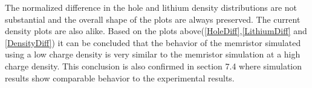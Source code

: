 \begin{doublespace}
 The normalized difference in the hole and lithium density distributions are not substantial and the overall shape of the plots are always preserved. The current density plots are also alike. Based on the plots above(\ref{HoleDiff},\ref{LithiumDiff} and \ref{DensityDiff}) it can be concluded that the behavior of the memristor simulated using a low charge density is very similar to the memristor simulation at a high charge density. This conclusion is also confirmed in section 7.4 where simulation results show comparable behavior to the experimental results.

\end{doublespace}


